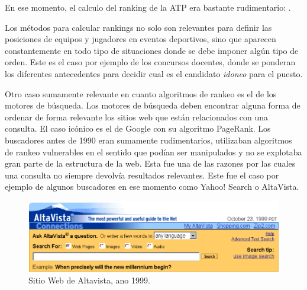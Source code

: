 En ese momento, el calculo del ranking de la ATP era bastante rudimentario:  \cite{nyt}.

Los métodos para calcular rankings no solo son relevantes para definir las posiciones de equipos y jugadores en eventos deportivos, sino que aparecen constantemente en todo tipo de situaciones donde se debe imponer algún tipo de orden. Este es el caso por ejemplo de los concursos docentes, donde se ponderan los diferentes antecedentes para decidir cual es el candidato \textit{idoneo} para el puesto.

Otro caso sumamente relevante en cuanto algoritmos de rankeo es el de los motores de búsqueda. Los motores de búsqueda deben encontrar alguna forma de ordenar de forma relevante los sitios web que están relacionados con una consulta. El caso icónico es el de Google con su algoritmo PageRank. Los buscadores antes de 1990 eran sumamente rudimentarios, utilizaban algoritmos de rankeo vulnerables en el sentido que podían ser manipulados y no se explotaba gran parte de la estructura de la web. Esta fue una de las razones por las cuales una consulta no siempre devolvía resultados relevantes. Este fue el caso por ejemplo de algunos buscadores en ese momento como Yahoo! Search o AltaVista.

\begin{figure}[H]
  \centering
  \includegraphics[scale=0.5]{images/altavista}
  \caption{Sitio Web de Altavista, ano 1999.}
\end{figure}

